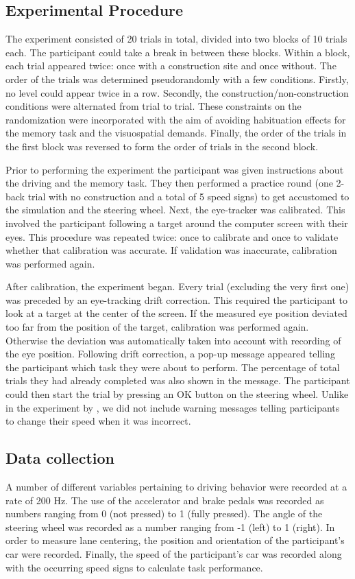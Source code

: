 \subsection{Experimental Procedure}
The experiment consisted of 20 trials in total, divided into two blocks of 10 trials each. 
The participant could take a break in between these blocks.
Within a block, each \nback trial appeared twice: once with a construction site and once without. 
The order of the trials was determined pseudorandomly with a few conditions. 
Firstly, no \nback level could appear twice in a row. 
Secondly, the construction/non-construction conditions were alternated from trial to trial. 
These constraints on the randomization were incorporated with the aim of avoiding habituation effects for the memory task and the visuospatial demands. 
Finally, the order of the trials in the first block was reversed to form the order of trials in the second block.

Prior to performing the experiment the participant was given instructions about the driving and the memory task. 
They then performed a practice round (one 2-back trial with no construction and a total of 5 speed signs) to get accustomed to the simulation and the steering wheel. 
Next, the eye-tracker was calibrated. 
This involved the participant following a target around the computer screen with their eyes. 
This procedure was repeated twice: once to calibrate and once to validate whether that calibration was accurate. 
If validation was inaccurate, calibration was performed again.

After calibration, the experiment began. 
Every trial (excluding the very first one) was preceded by an eye-tracking drift correction. 
This required the participant to look at a target at the center of the screen. 
If the measured eye position deviated too far from the position of the target, calibration was performed again. 
Otherwise the deviation was automatically taken into account with recording of the eye position.
Following drift correction, a pop-up message appeared telling the participant which \nback task they were about to perform.
The percentage of total trials they had already completed was also shown in the message. 
The participant could then start the trial by pressing an OK button on the steering wheel.
Unlike in the experiment by \citeauthor{Scheunemann2019}, we did not include warning messages telling participants to change their speed when it was incorrect.

\subsection{Data collection}
A number of different variables pertaining to driving behavior were recorded at a rate of 200 Hz. 
The use of the accelerator and brake pedals was recorded as numbers ranging from 0 (not pressed) to 1 (fully pressed). 
The angle of the steering wheel was recorded as a number ranging from -1 (left) to 1 (right).
In order to measure lane centering, the position and orientation of the participant's car were recorded. 
Finally, the speed of the participant's car was recorded along with the occurring speed signs to calculate \nback task performance. 

